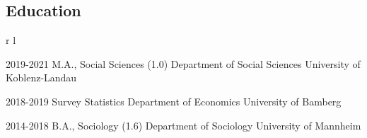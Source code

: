 \documentclass[10pt]{FreemanCV}
\begin{document}
\begin{paracol}{2}

\section{Education} 




\begin{supertabular}{r l} 


	\qualificationentry
		{2019-2021}
		{M.A., Social Sciences \textsc{(1.0)}}
		{} 
		{Department of Social Sciences}
		{University of Koblenz-Landau}

	\qualificationentry
		{2018-2019}
		{Survey Statistics}
		{} 
		{Department of Economics} 
		{University of Bamberg}

	\qualificationentry
		{2014-2018}
		{B.A., Sociology \textsc{(1.6)}}
		{} 
		{Department of Sociology}
		{University of Mannheim}


\end{supertabular}




	

\end{paracol}
\end{document}
